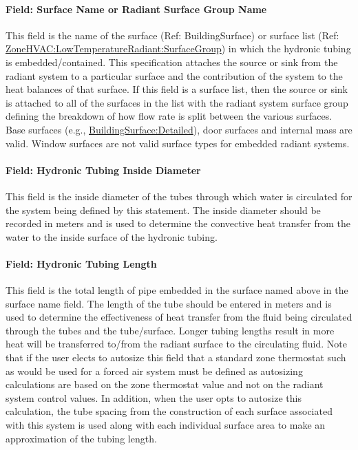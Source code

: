 \paragraph{Field: Surface Name or Radiant Surface Group Name}\label{field-surface-name-or-radiant-surface-group-name}

This field is the name of the surface (Ref: BuildingSurface) or surface list (Ref: \hyperref[zonehvaclowtemperatureradiantsurfacegroup]{ZoneHVAC:LowTemperatureRadiant:SurfaceGroup}) in which the hydronic tubing is embedded/contained. This specification attaches the source or sink from the radiant system to a particular surface and the contribution of the system to the heat balances of that surface. If this field is a surface list, then the source or sink is attached to all of the surfaces in the list with the radiant system surface group defining the breakdown of how flow rate is split between the various surfaces. Base surfaces (e.g., \hyperref[buildingsurfacedetailed]{BuildingSurface:Detailed}), door surfaces and internal mass are valid. Window surfaces are not valid surface types for embedded radiant systems.

\paragraph{Field: Hydronic Tubing Inside Diameter}\label{field-hydronic-tubing-inside-diameter-000}

This field is the inside diameter of the tubes through which water is circulated for the system being defined by this statement. The inside diameter should be recorded in meters and is used to determine the convective heat transfer from the water to the inside surface of the hydronic tubing.

\paragraph{Field: Hydronic Tubing Length}\label{field-hydronic-tubing-length}

This field is the total length of pipe embedded in the surface named above in the surface name field. The length of the tube should be entered in meters and is used to determine the effectiveness of heat transfer from the fluid being circulated through the tubes and the tube/surface. Longer tubing lengths result in more heat will be transferred to/from the radiant surface to the circulating fluid. Note that if the user elects to autosize this field that a standard zone thermostat such as would be used for a forced air system must be defined as autosizing calculations are based on the zone thermostat value and not on the radiant system control values. In addition, when the user opts to autosize this calculation, the tube spacing from the construction of each surface associated with this system is used along with each individual surface area to make an approximation of the tubing length.

